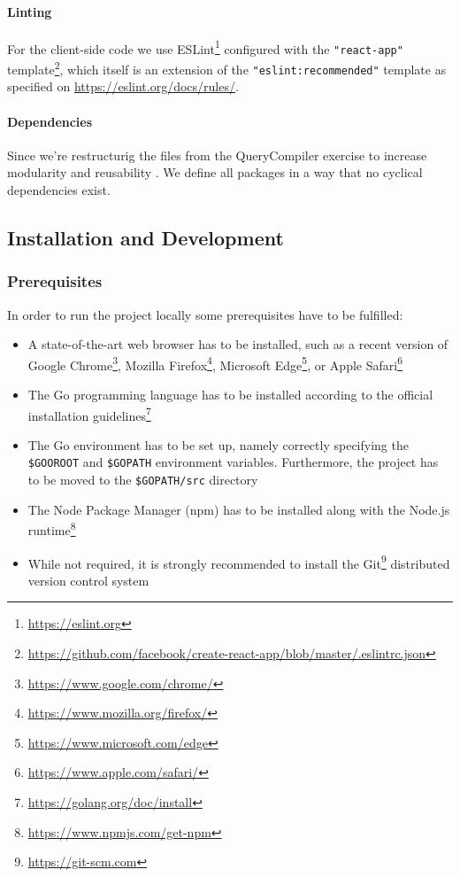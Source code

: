 \paragraph{Linting}
For the client-side code we use ESLint\footnote{\url{https://eslint.org}} configured with the \texttt{"react-app"} template\footnote{\url{https://github.com/facebook/create-react-app/blob/master/.eslintrc.json}}, which itself is an extension of the \texttt{"eslint:recommended"} template as specified on \url{https://eslint.org/docs/rules/}.

\paragraph{Dependencies}

Since we're restructurig the files from the QueryCompiler exercise to increase modularity and reusability . We define all packages in a way that no cyclical dependencies exist.

\subsection{Installation and Development}

\subsubsection{Prerequisites}
\label{subsub:implementation-prerequisites}

In order to run the project locally some prerequisites have to be fulfilled:
\begin{itemize}
    \item A state-of-the-art web browser has to be installed, such as a recent version of Google Chrome\footnote{\url{https://www.google.com/chrome/}}, Mozilla Firefox\footnote{\url{https://www.mozilla.org/firefox/}}, Microsoft Edge\footnote{\url{https://www.microsoft.com/edge}}, or Apple Safari\footnote{\url{https://www.apple.com/safari/}}
    \item The Go programming language has to be installed according to the official installation guidelines\footnote{\url{https://golang.org/doc/install}}
    \item The Go environment has to be set up, namely correctly specifying the \texttt{\$GOOROOT} and \texttt{\$GOPATH} environment variables. Furthermore, the project has to be moved to the \texttt{\$GOPATH/src} directory
    \item The Node Package Manager (npm) has to be installed along with the Node.js runtime\footnote{\url{https://www.npmjs.com/get-npm}}
    \item While not required, it is strongly recommended to install the Git\footnote{\url{https://git-scm.com}} distributed version control system 
\end{itemize}


